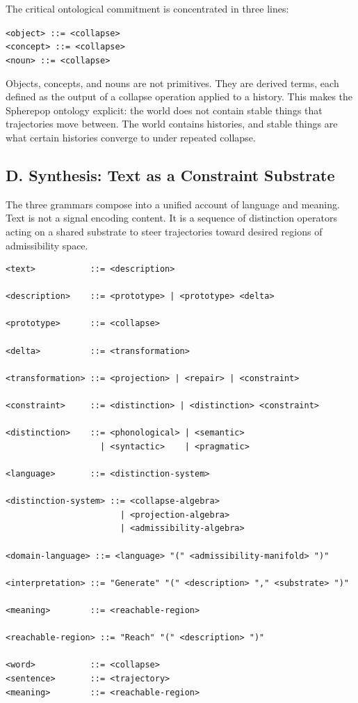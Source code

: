 \documentclass[12pt,a4paper]{article}
\begin{document}
\noindent The critical ontological commitment is concentrated in three lines:

\medskip
\texttt{<object> ::= <collapse>}\\
\texttt{<concept> ::= <collapse>}\\
\texttt{<noun> ::= <collapse>}
\medskip

\noindent Objects, concepts, and nouns are not primitives. They are derived terms, each defined as the output of a collapse operation applied to a history. This makes the Spherepop ontology explicit: the world does not contain stable things that trajectories move between. The world contains histories, and stable things are what certain histories converge to under repeated collapse.

\subsection*{D. Synthesis: Text as a Constraint Substrate}

The three grammars compose into a unified account of language and meaning. Text is not a signal encoding content. It is a sequence of distinction operators acting on a shared substrate to steer trajectories toward desired regions of admissibility space.

\begin{verbatim}
<text>           ::= <description>

<description>    ::= <prototype> | <prototype> <delta>

<prototype>      ::= <collapse>

<delta>          ::= <transformation>

<transformation> ::= <projection> | <repair> | <constraint>

<constraint>     ::= <distinction> | <distinction> <constraint>

<distinction>    ::= <phonological> | <semantic>
                   | <syntactic>    | <pragmatic>

<language>       ::= <distinction-system>

<distinction-system> ::= <collapse-algebra>
                       | <projection-algebra>
                       | <admissibility-algebra>

<domain-language> ::= <language> "(" <admissibility-manifold> ")"

<interpretation> ::= "Generate" "(" <description> "," <substrate> ")"

<meaning>        ::= <reachable-region>

<reachable-region> ::= "Reach" "(" <description> ")"

<word>           ::= <collapse>
<sentence>       ::= <trajectory>
<meaning>        ::= <reachable-region>
\end{verbatim}
\end{document}
